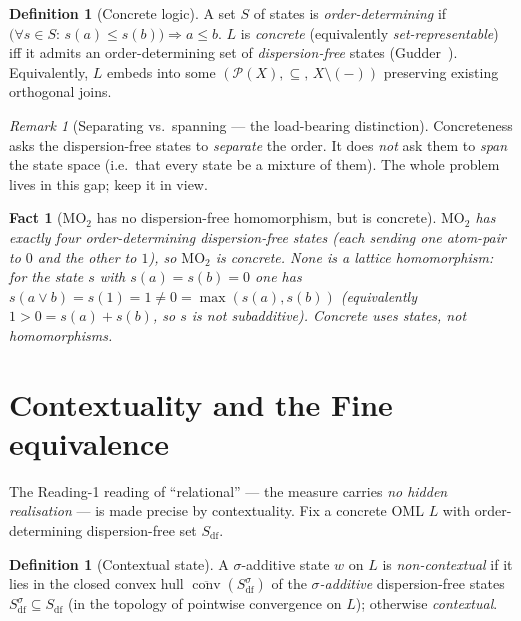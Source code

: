\documentclass[11pt]{article}
\newtheorem{fact}[theorem]{Fact}
\theoremstyle{definition}
\newtheorem{definition}[theorem]{Definition}
\theoremstyle{remark}
\newtheorem{remark}[theorem]{Remark}
\newcommand{\MOO}{\mathrm{MO}_2}
\newcommand{\df}{\mathrm{df}}            %
\newcommand{\conv}{\overline{\operatorname{conv}}}
\begin{document}
\begin{definition}[Concrete logic]\label{def:concrete}
A set $S$ of states is \emph{order-determining} if
$\bigl(\forall s\in S:\,s(a)\le s(b)\bigr)\Rightarrow a\le b$. $L$ is
\emph{concrete} (equivalently \emph{set-representable}) iff it admits an
order-determining set of \emph{dispersion-free} states (Gudder~\cite{Gudder1979}).
Equivalently, $L$ embeds into some $(\mathcal P(X),\subseteq,\,X\setminus(-))$
preserving existing orthogonal joins.
\end{definition}

\begin{remark}[Separating vs.\ spanning --- the load-bearing distinction]\label{rem:sepspan}
Concreteness asks the dispersion-free states to \emph{separate} the order. It does
\emph{not} ask them to \emph{span} the state space (i.e.\ that every state be a
mixture of them). The whole problem lives in this gap; keep it in view.
\end{remark}

\begin{fact}[$\MOO$ has no dispersion-free homomorphism, but is concrete]\label{fact:mo2states}
$\MOO$ has exactly four order-determining dispersion-free \emph{states} (each
sending one atom-pair to $0$ and the other to $1$), so $\MOO$ is concrete. None is
a lattice \emph{homomorphism}: for the state $s$ with $s(a)=s(b)=0$ one has
$s(a\vee b)=s(1)=1\neq 0=\max(s(a),s(b))$ (equivalently $1>0=s(a)+s(b)$, so $s$ is
not subadditive). \emph{Concrete uses states, not homomorphisms.}
\end{fact}

\section{Contextuality and the Fine equivalence}\label{sec:context}

The Reading-1 reading of ``relational'' --- the measure carries \emph{no hidden
realisation} --- is made precise by contextuality. Fix a concrete OML $L$ with
order-determining dispersion-free set $S_{\df}$.

\begin{definition}[Contextual state]\label{def:contextual}
A $\sigma$-additive state $w$ on $L$ is \emph{non-contextual} if it lies in the
closed convex hull $\conv(S_{\df}^{\sigma})$ of the \emph{$\sigma$-additive}
dispersion-free states $S_{\df}^{\sigma}\subseteq S_{\df}$ (in the topology of
pointwise convergence on $L$); otherwise \emph{contextual}.
\end{definition}
\end{document}
